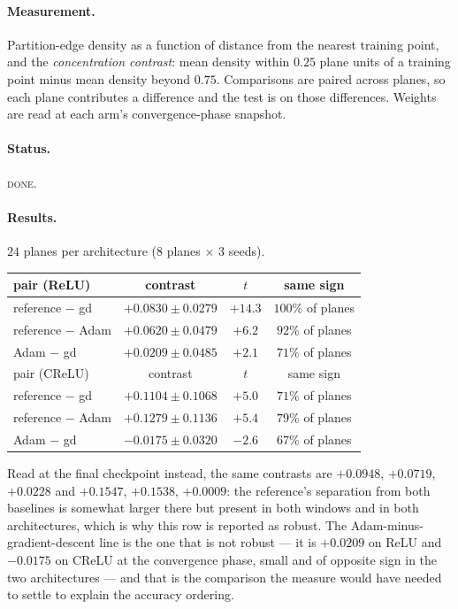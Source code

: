 \documentclass{article} %
\theoremstyle{plain}
\theoremstyle{definition}
\theoremstyle{remark}
\begin{document}
\paragraph{Measurement.}
Partition-edge density as a function of distance from the nearest training point, and the
\emph{concentration contrast}: mean density within $0.25$ plane units of a training point minus
mean density beyond $0.75$. Comparisons are paired across planes, so each plane contributes a
difference and the test is on those differences. Weights are read at each arm's convergence-phase
snapshot.

\paragraph{Status.} \textsc{done}.

\paragraph{Results.} $24$ planes per architecture ($8$ planes $\times$ $3$ seeds).

\begin{center}\small
\begin{tabular}{lccc}
\toprule
pair (ReLU) & contrast & $t$ & same sign \\
\midrule
reference $-$ gd   & $+0.0830 \pm 0.0279$ & $+14.3$ & $100\%$ of planes \\
reference $-$ Adam & $+0.0620 \pm 0.0479$ & $+6.2$  & $92\%$ of planes \\
Adam $-$ gd        & $+0.0209 \pm 0.0485$ & $+2.1$  & $71\%$ of planes \\
\midrule
pair (CReLU) & contrast & $t$ & same sign \\
\midrule
reference $-$ gd   & $+0.1104 \pm 0.1068$ & $+5.0$ & $71\%$ of planes \\
reference $-$ Adam & $+0.1279 \pm 0.1136$ & $+5.4$ & $79\%$ of planes \\
Adam $-$ gd        & $-0.0175 \pm 0.0320$ & $-2.6$ & $67\%$ of planes \\
\bottomrule
\end{tabular}
\end{center}

\noindent Read at the final checkpoint instead, the same contrasts are $+0.0948$, $+0.0719$,
$+0.0228$ and $+0.1547$, $+0.1538$, $+0.0009$: the reference's separation from both baselines is
somewhat larger there but present in both windows and in both architectures, which is why this row
is reported as robust. The Adam-minus-gradient-descent line is the one that is not robust --- it is
$+0.0209$ on ReLU and $-0.0175$ on CReLU at the convergence phase, small and of opposite sign in
the two architectures --- and that is the comparison the measure would have needed to settle to
explain the accuracy ordering.
\end{document}
